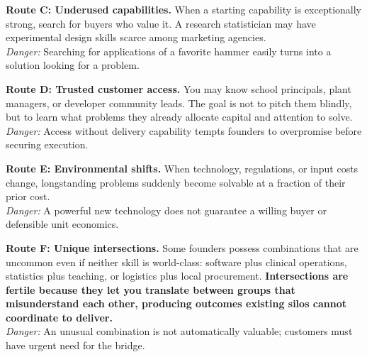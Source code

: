 \textbf{Route C: Underused capabilities.} When a starting capability is exceptionally strong, search for buyers who value it. A research statistician may have experimental design skills scarce among marketing agencies. \\
\textit{Danger:} Searching for applications of a favorite hammer easily turns into a solution looking for a problem.

\textbf{Route D: Trusted customer access.} You may know school principals, plant managers, or developer community leads. The goal is not to pitch them blindly, but to learn what problems they already allocate capital and attention to solve. \\
\textit{Danger:} Access without delivery capability tempts founders to overpromise before securing execution.

\textbf{Route E: Environmental shifts.} When technology, regulations, or input costs change, longstanding problems suddenly become solvable at a fraction of their prior cost. \\
\textit{Danger:} A powerful new technology does not guarantee a willing buyer or defensible unit economics.

\textbf{Route F: Unique intersections.} Some founders possess combinations that are uncommon even if neither skill is world-class: software plus clinical operations, statistics plus teaching, or logistics plus local procurement. \textbf{Intersections are fertile because they let you translate between groups that misunderstand each other, producing outcomes existing silos cannot coordinate to deliver.} \\
\textit{Danger:} An unusual combination is not automatically valuable; customers must have urgent need for the bridge.
